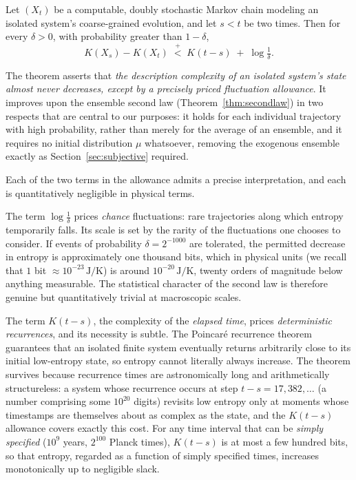 \documentclass[11pt]{article}
\newcommand{\plt}{\mathrel{\stackrel{+}{<}}}
\begin{document}
\begin{theorem}
\label{thm:algsecond}
Let $(X_t)$ be a computable, doubly stochastic Markov chain modeling an isolated system's coarse-grained evolution, and let $s < t$ be two times. Then for every $\delta > 0$, with probability greater than $1 - \delta$,
\[
K(X_s) - K(X_t) \;\plt\; K(t - s) \;+\; \log \tfrac1\delta .
\]
\end{theorem}

The theorem asserts that \emph{the description complexity of an isolated system's state almost never decreases, except by a precisely priced fluctuation allowance}. It improves upon the ensemble second law (Theorem~\ref{thm:secondlaw}) in two respects that are central to our purposes: it holds for each individual trajectory with high probability, rather than merely for the average of an ensemble, and it requires no initial distribution $\mu$ whatsoever, removing the exogenous ensemble exactly as Section~\ref{sec:subjective} required.

Each of the two terms in the allowance admits a precise interpretation, and each is quantitatively negligible in physical terms.

The term $\log\frac1\delta$ prices \emph{chance} fluctuations: rare trajectories along which entropy temporarily falls. Its scale is set by the rarity of the fluctuations one chooses to consider. If events of probability $\delta = 2^{-1000}$ are tolerated, the permitted decrease in entropy is approximately one thousand bits, which in physical units (we recall that $1$ bit $\approx 10^{-23}\,\mathrm{J/K}$) is around $10^{-20}\,\mathrm{J/K}$, twenty orders of magnitude below anything measurable. The statistical character of the second law is therefore genuine but quantitatively trivial at macroscopic scales.

The term $K(t-s)$, the complexity of the \emph{elapsed time}, prices \emph{deterministic recurrences}, and its necessity is subtle. The Poincar\'e recurrence theorem guarantees that an isolated finite system eventually returns arbitrarily close to its initial low-entropy state, so entropy cannot literally always increase. The theorem survives because recurrence times are astronomically long and arithmetically structureless: a system whose recurrence occurs at step $t - s = 17{,}382{,}\dots$ (a number comprising some $10^{20}$ digits) revisits low entropy only at moments whose timestamps are themselves about as complex as the state, and the $K(t-s)$ allowance covers exactly this cost. For any time interval that can be \emph{simply specified} ($10^9$ years, $2^{100}$ Planck times), $K(t-s)$ is at most a few hundred bits, so that entropy, regarded as a function of simply specified times, increases monotonically up to negligible slack.
\end{document}
